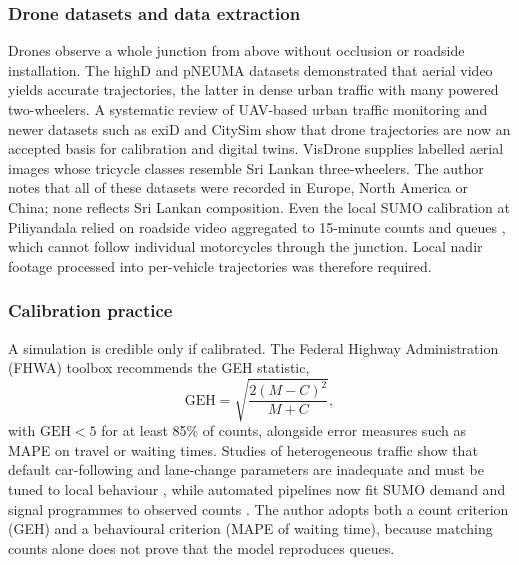 \subsubsection{Drone datasets and data extraction}
Drones observe a whole junction from above without occlusion or roadside installation. The highD
\cite{krajewski2018highd} and pNEUMA \cite{barmpounakis2020pneuma} datasets demonstrated that aerial video yields
accurate trajectories, the latter in dense urban traffic with many powered two-wheelers. A systematic review of
UAV-based urban traffic monitoring \cite{butila2022urban} and newer datasets such as exiD \cite{moers2022exid} and
CitySim \cite{zheng2024citysim} show that drone trajectories are now an accepted basis for calibration and
digital twins. VisDrone \cite{zhu2022visdrone} supplies labelled aerial images whose tricycle classes resemble
Sri Lankan three-wheelers. The author notes that all of these datasets were recorded in Europe, North America
or China; none reflects Sri Lankan composition. Even the local SUMO calibration at Piliyandala relied on
roadside video aggregated to 15-minute counts and queues \cite{salawavidana2026aggregate}, which cannot follow
individual motorcycles through the junction. Local nadir footage processed into per-vehicle trajectories was
therefore required.

\subsubsection{Calibration practice}
A simulation is credible only if calibrated. The Federal Highway Administration (FHWA) toolbox
\cite{dowling2004toolbox} recommends the GEH statistic,
\begin{equation}
  \mathrm{GEH} = \sqrt{\frac{2(M-C)^2}{M+C}},
  \label{eq:lit-geh}
\end{equation}
with $\mathrm{GEH}<5$ for at least 85\% of counts, alongside error measures such as MAPE on travel or
waiting times. Studies of heterogeneous traffic show that default
car-following and lane-change parameters are inadequate and must be tuned to local behaviour
\cite{mathew2010calibration,chowdhury2024calibration,salawavidana2026aggregate}, while automated pipelines
now fit SUMO demand and signal programmes to observed counts \cite{harth2022automated}. The author adopts both a count criterion (GEH) and a behavioural criterion
(MAPE of waiting time), because matching counts alone does not prove that the model reproduces queues.

